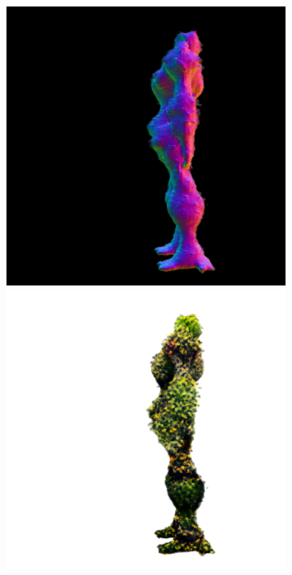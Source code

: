 \begin{figure}[ht]
\begin{subfigure}[b]{0.222\textwidth}
        \includegraphics[width=\textwidth]{figures/appendix/magic123_coarse_robot_left_5000_part2.png}
        \includegraphics[width=\textwidth]{figures/appendix/magic123_coarse_robot_left_5000_part1.png}

\end{subfigure}
\end{figure}
